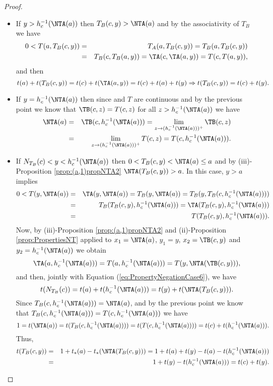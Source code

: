 \begin{proof}
\begin{itemize}
		\item If $y > h_c^{-1}(\NTA(a))$ then $T_B(c,y) > \NTA(a)$ and by the associativity of $T_B$ we have
		\begin{eqnarray*}
			0<T(a,T_B(c,y)) &=& T_A(a,T_B(c,y))=T_B(a,T_B(c,y))\\
			&=&T_B(c,T_B(a,y)) = \TA(c,\TA(a,y)) = T(c,T(a,y)),
		\end{eqnarray*}
		and then
		$$t(a)+t(T_B(c,y)) = t(c)+t(\TA(a,y)) =t(c)+t(a)+t(y) \Rightarrow t(T_B(c,y)) = t(c)+t(y).$$
		\item If $y=h_c^{-1}(\NTA(a))$ then since \TB and $T$ are continuous and by the previous point we know that $\TB(c,z)=T(c,z)$ for all $z > h_c^{-1}(\NTA(a))$ we have
		\begin{eqnarray*}
			\NTA(a) &=& \TB(c,h_c^{-1}(\NTA(a)))= \lim_{z \to (h_c^{-1}(\NTA(a)))^+} \TB(c,z) \\
			&=& \lim_{z \to (h_c^{-1}(\NTA(a)))^+} T(c,z)= T(c,h_c^{-1}(\NTA(a))).
		\end{eqnarray*}
		\item If $N_{T_B}(c)<y<h_c^{-1}(\NTA(a))$ then $0<T_B(c,y)<\NTA(a) \leq a$ and by (iii)-Proposition \ref{prop:(a,1)propNTA2}  $\NTA(T_B(c,y)) > a$. In this case, $y>a$ implies
		\begin{eqnarray*}
			0<T(y,\NTA(a)) &=& \TA(y,\NTA(a)) = T_B(y,\NTA(a))=T_B(y,T_B(c,h_c^{-1}(\NTA(a)))) \\
			&=& T_B(T_B(c,y),h_c^{-1}(\NTA(a))) = \TA(T_B(c,y),h_c^{-1}(\NTA(a))) \\
			&=& T(T_B(c,y),h_c^{-1}(\NTA(a))).
		\end{eqnarray*}
		Now, by (iii)-Proposition \ref{prop:(a,1)propNTA2} and (ii)-Proposition \ref{prop:PropertiesNT} applied to $x_1=\NTA(a)$, $y_1= y$, $x_2=\TB(c,y)$ and $y_2=h_c^{-1}(\NTA(a))$ we obtain
		$$\TA(a,h_c^{-1}(\NTA(a))) = T(a,h_c^{-1}(\NTA(a))) = T(y,\NTA(\TB(c,y))),$$
		and then, jointly with Equation (\ref{eq:PropertyNegationCase6}), we have
		$$t(N_{T_B}(c)) = t(a) + t(h_c^{-1}(\NTA(a))) = t(y) + t(\NTA(T_B(c,y))).$$
		Since $T_B(c,h_c^{-1}(\NTA(a)))= \NTA(a)$, and by the previous point we know that \linebreak $T_B(c,h_c^{-1}(\NTA(a))) = T(c,h_c^{-1}(\NTA(a)))$ we have
		$$1=t(\NTA(a))=t(T_B(c,h_c^{-1}(\NTA(a)))) = t(T(c,h_c^{-1}(\NTA(a)))) = t(c)+t(h_c^{-1}(\NTA(a))).$$
		Thus,
		\begin{eqnarray*}
			t(T_B(c,y)) & = & 1 + t_*(a)-t_*(\NTA(T_B(c,y))) = 1+ t(a) + t(y)-t(a)-t(h_c^{-1}(\NTA(a))) \\
			& = & 1 + t(y) - t(h_c^{-1}(\NTA(a))) = t(c) + t(y).

\end{eqnarray*}
\end{itemize}
\end{proof}
